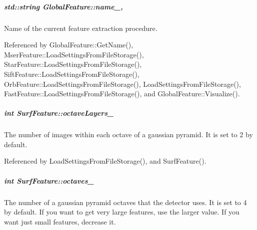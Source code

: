 \hypertarget{group___feature_extractor_abee52be830de272bd27685083bf28aae}{
\subparagraph[{name\-\_\-}]{\setlength{\rightskip}{0pt plus 5cm}std\-::string Global\-Feature\-::name\-\_\-\hspace{0.3cm}{\ttfamily [protected]}, {\ttfamily [inherited]}}}\label{group___feature_extractor_abee52be830de272bd27685083bf28aae}


Name of the current feature extraction procedure. 



Referenced by Global\-Feature\-::\-Get\-Name(), Mser\-Feature\-::\-Load\-Settings\-From\-File\-Storage(), Star\-Feature\-::\-Load\-Settings\-From\-File\-Storage(), Sift\-Feature\-::\-Load\-Settings\-From\-File\-Storage(), Orb\-Feature\-::\-Load\-Settings\-From\-File\-Storage(), Load\-Settings\-From\-File\-Storage(), Fast\-Feature\-::\-Load\-Settings\-From\-File\-Storage(), and Global\-Feature\-::\-Visualize().

\hypertarget{group___feature_extractor_a1693fb1e68f90350c607c1e228743130}{
\subparagraph[{octave\-Layers\-\_\-}]{\setlength{\rightskip}{0pt plus 5cm}int Surf\-Feature\-::octave\-Layers\-\_\-\hspace{0.3cm}{\ttfamily [private]}}}\label{group___feature_extractor_a1693fb1e68f90350c607c1e228743130}


The number of images within each octave of a gaussian pyramid. It is set to 2 by default. 



Referenced by Load\-Settings\-From\-File\-Storage(), and Surf\-Feature().

\hypertarget{group___feature_extractor_a87f1c0c6c1c749b0736633da668c977b}{
\subparagraph[{octaves\-\_\-}]{\setlength{\rightskip}{0pt plus 5cm}int Surf\-Feature\-::octaves\-\_\-\hspace{0.3cm}{\ttfamily [private]}}}\label{group___feature_extractor_a87f1c0c6c1c749b0736633da668c977b}


The number of a gaussian pyramid octaves that the detector uses. It is set to 4 by default. If you want to get very large features, use the larger value. If you want just small features, decrease it. 



